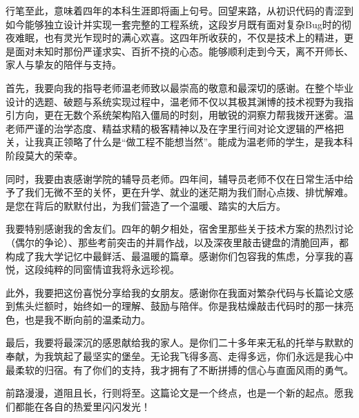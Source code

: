 
\begin{acknowledgements}

行笔至此，意味着四年的本科生涯即将画上句号。回望来路，从初识代码的青涩到如今能够独立设计并实现一套完整的工程系统，这段岁月既有面对复杂Bug时的彻夜难眠，也有灵光乍现时的满心欢喜。这四年所收获的，不仅是技术上的精进，更是面对未知时那份严谨求实、百折不挠的心态。能够顺利走到今天，离不开师长、家人与挚友的陪伴与支持。

首先，我要向我的指导老师温老师致以最崇高的敬意和最深切的感谢。在整个毕业设计的选题、破题与系统实现过程中，温老师不仅以其极其渊博的技术视野为我指引方向，更在无数个系统架构陷入僵局的时刻，用敏锐的洞察力帮我拨开迷雾。温老师严谨的治学态度、精益求精的极客精神以及在字里行间对论文逻辑的严格把关，让我真正领略了什么是“做工程不能想当然”。能成为温老师的学生，是我本科阶段莫大的荣幸。

同时，我要由衷感谢学院的辅导员老师。四年间，辅导员老师不仅在日常生活中给予了我们无微不至的关怀，更在升学、就业的迷茫期为我们耐心点拨、排忧解难。是您在背后的默默付出，为我们营造了一个温暖、踏实的大后方。

我要特别感谢我的舍友们。四年的朝夕相处，宿舍里那些关于技术方案的热烈讨论（偶尔的争论）、那些考前突击的并肩作战，以及深夜里敲击键盘的清脆回声，都构成了我大学记忆中最鲜活、最温暖的篇章。感谢你们包容我的焦虑，分享我的喜悦，这段纯粹的同窗情谊我将永远珍视。

此外，我要把这份喜悦分享给我的女朋友。感谢你在我面对繁杂代码与长篇论文感到焦头烂额时，始终如一的理解、鼓励与陪伴。你是我枯燥敲击代码时的那一抹亮色，也是我不断向前的温柔动力。

最后，我要将最深沉的感恩献给我的家人。是你们二十多年来无私的托举与默默的奉献，为我筑起了最坚实的堡垒。无论我飞得多高、走得多远，你们永远是我心中最柔软的归宿。有了你们的支持，我才拥有了不断拼搏的信心与直面风雨的勇气。

前路漫漫，道阻且长，行则将至。这篇论文是一个终点，也是一个新的起点。愿我们都能在各自的热爱里闪闪发光！

\end{acknowledgements}
